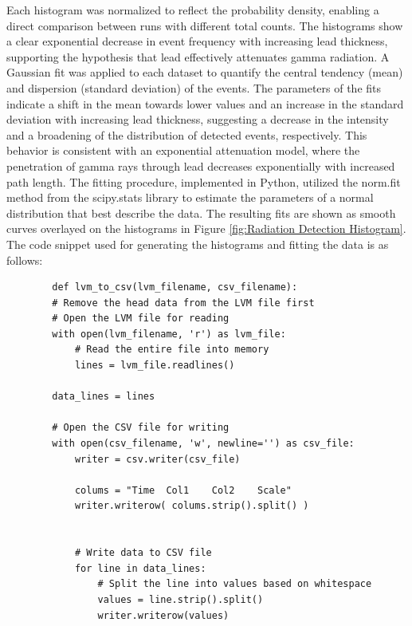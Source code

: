 \documentclass[12pt]{article}
\begin{document}
    Each histogram was normalized to reflect the probability density, enabling a direct 
    comparison between runs with different total counts. The histograms show a clear 
    exponential decrease in event frequency with increasing lead thickness, supporting 
    the hypothesis that lead effectively attenuates gamma radiation.
    A Gaussian fit was applied to each dataset to quantify the central tendency (mean) 
    and dispersion (standard deviation) of the events. The parameters of the fits 
    indicate a shift in the mean towards lower values and an increase in the standard 
    deviation with increasing lead thickness, suggesting a decrease in the intensity 
    and a broadening of the distribution of detected events, respectively. This behavior 
    is consistent with an exponential attenuation model, where the penetration of gamma 
    rays through lead decreases exponentially with increased path length.
    The fitting procedure, implemented in Python, utilized the norm.fit method from 
    the scipy.stats library to estimate the parameters of a normal distribution that 
    best describe the data. The resulting fits are shown as smooth curves overlayed on the 
    histograms in Figure \ref{fig:Radiation Detection Histogram}.
    The code snippet used for generating the histograms and fitting the data is as follows:


    \lstset{language=Python}
    \lstset{frame=lines}
    \lstset{basicstyle=\footnotesize}
    \begin{lstlisting}
        def lvm_to_csv(lvm_filename, csv_filename):
        # Remove the head data from the LVM file first
        # Open the LVM file for reading
        with open(lvm_filename, 'r') as lvm_file:
            # Read the entire file into memory
            lines = lvm_file.readlines()
    
        data_lines = lines
    
        # Open the CSV file for writing
        with open(csv_filename, 'w', newline='') as csv_file:
            writer = csv.writer(csv_file)
            
            colums = "Time	Col1	Col2	Scale"
            writer.writerow( colums.strip().split() )
            
            
            # Write data to CSV file
            for line in data_lines:
                # Split the line into values based on whitespace
                values = line.strip().split()
                writer.writerow(values)
    \end{lstlisting}
\end{document}
